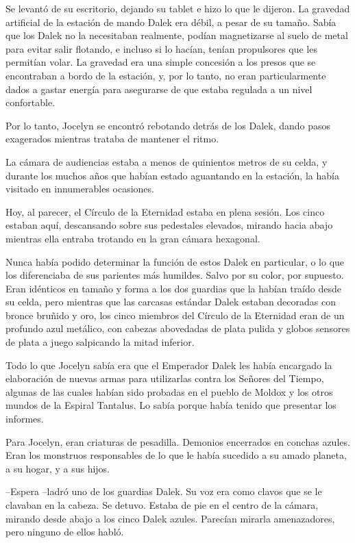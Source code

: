 Se levantó de su escritorio, dejando su tablet e hizo lo que le dijeron. La gravedad artificial de la estación de mando Dalek era débil, a pesar de su tamaño. Sabía que los Dalek no la necesitaban realmente, podían magnetizarse al suelo de metal para evitar salir flotando, e incluso si lo hacían, tenían propulsores que les permitían volar. La gravedad era una simple concesión a los presos que se encontraban a bordo de la estación, y, por lo tanto, no eran particularmente dados a gastar energía para asegurarse de que estaba regulada a un nivel confortable. 

Por lo tanto, Jocelyn se encontró rebotando detrás de los Dalek, dando pasos exagerados mientras trataba de mantener el ritmo. 

La cámara de audiencias estaba a menos de quinientos metros de su celda, y durante los muchos años que habían estado aguantando en la estación, la había visitado en innumerables ocasiones. 

Hoy, al parecer, el Círculo de la Eternidad estaba en plena sesión. Los cinco estaban aquí, descansando sobre sus pedestales elevados, mirando hacia abajo mientras ella entraba trotando en la gran cámara hexagonal. 

Nunca había podido determinar la función de estos Dalek en particular, o lo que los diferenciaba de sus parientes más humildes. Salvo por su color, por supuesto. Eran idénticos en tamaño y forma a los dos guardias que la habían traído desde su celda, pero mientras que las carcasas estándar Dalek estaban decoradas con bronce bruñido y oro, los cinco miembros del Círculo de la Eternidad eran de un profundo azul metálico, con cabezas abovedadas de plata pulida y globos sensores de plata a juego salpicando la mitad inferior. 

Todo lo que Jocelyn sabía era que el Emperador Dalek les había encargado la elaboración de nuevas armas para utilizarlas contra los Señores del Tiempo, algunas de las cuales habían sido probadas en el pueblo de Moldox y los otros mundos de la Espiral Tantalus. Lo sabía porque había tenido que presentar los informes. 

Para Jocelyn, eran criaturas de pesadilla. Demonios encerrados en conchas azules. Eran los monstruos responsables de lo que le había sucedido a su amado planeta, a su hogar, y a sus hijos. 

--Espera --ladró uno de los guardias Dalek. Su voz era como clavos que se le clavaban en la cabeza. Se detuvo. Estaba de pie en el centro de la cámara, mirando desde abajo a los cinco Dalek azules. Parecían mirarla amenazadores, pero ninguno de ellos habló. 

